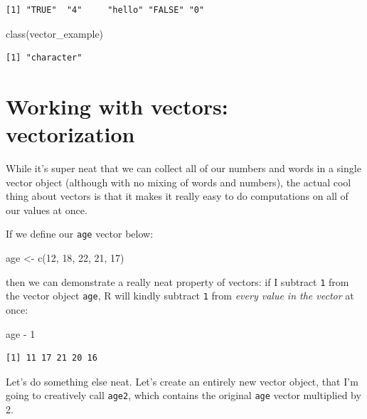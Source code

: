 \documentclass[
  letterpaper,
  DIV=11,
  numbers=noendperiod]{scrreprt}
\newenvironment{Shaded}{\begin{snugshade}}{\end{snugshade}}
\newcommand{\DecValTok}[1]{\textcolor[rgb]{0.68,0.00,0.00}{#1}}
\newcommand{\FunctionTok}[1]{\textcolor[rgb]{0.28,0.35,0.67}{#1}}
\newcommand{\NormalTok}[1]{\textcolor[rgb]{0.00,0.23,0.31}{#1}}
\newcommand{\OtherTok}[1]{\textcolor[rgb]{0.00,0.23,0.31}{#1}}
\newcommand{\SpecialCharTok}[1]{\textcolor[rgb]{0.37,0.37,0.37}{#1}}
\begin{document}
\begin{verbatim}
[1] "TRUE"  "4"     "hello" "FALSE" "0"    
\end{verbatim}

\begin{Shaded}
\begin{Highlighting}[]
\FunctionTok{class}\NormalTok{(vector\_example)}
\end{Highlighting}
\end{Shaded}

\begin{verbatim}
[1] "character"
\end{verbatim}

\section{Working with vectors:
vectorization}\label{working-with-vectors-vectorization}

While it's super neat that we can collect all of our numbers and words
in a single vector object (although with no mixing of words and
numbers), the actual cool thing about vectors is that it makes it really
easy to do computations on all of our values at once.

If we define our \texttt{age} vector below:

\begin{Shaded}
\begin{Highlighting}[]
\NormalTok{age }\OtherTok{\textless{}{-}} \FunctionTok{c}\NormalTok{(}\DecValTok{12}\NormalTok{, }\DecValTok{18}\NormalTok{, }\DecValTok{22}\NormalTok{, }\DecValTok{21}\NormalTok{, }\DecValTok{17}\NormalTok{)}
\end{Highlighting}
\end{Shaded}

then we can demonstrate a really neat property of vectors: if I subtract
\texttt{1} from the vector object \texttt{age}, R will kindly subtract
\texttt{1} from \emph{every value in the vector} at once:

\begin{Shaded}
\begin{Highlighting}[]
\NormalTok{age }\SpecialCharTok{{-}} \DecValTok{1}
\end{Highlighting}
\end{Shaded}

\begin{verbatim}
[1] 11 17 21 20 16
\end{verbatim}

Let's do something else neat. Let's create an entirely new vector
object, that I'm going to creatively call \texttt{age2}, which contains
the original \texttt{age} vector multiplied by 2.
\end{document}
